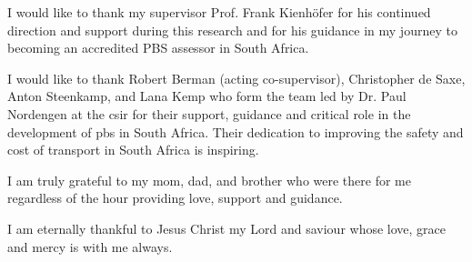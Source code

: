\begin{justify}

\setlength{\parindent}{0in}
I would like to thank my supervisor Prof. Frank Kienh{\"o}fer for his continued direction and support during this research and for his guidance in my journey to becoming an accredited PBS assessor in South Africa.

I would like to thank Robert Berman (acting co-supervisor), Christopher de Saxe, Anton Steenkamp, and Lana Kemp who form the team led by Dr. Paul Nordengen at the \gls{csir} for their support, guidance and critical role in the development of \gls{pbs} in South Africa. Their dedication to improving the safety and cost of transport in South Africa is inspiring.

I am truly grateful to my mom, dad, and brother who were there for me regardless of the hour providing love, support and guidance.

I am eternally thankful to Jesus Christ my Lord and saviour whose love, grace and mercy is with me always.

\end{justify}